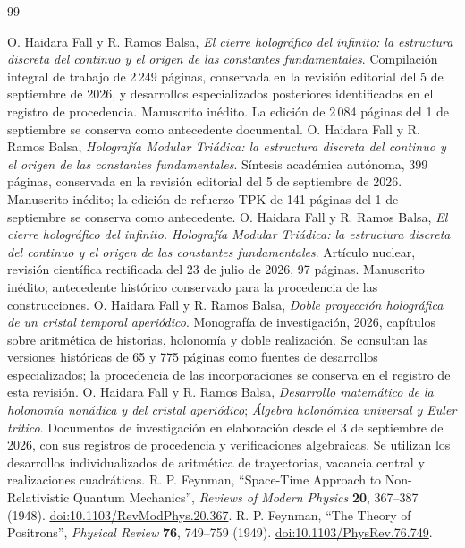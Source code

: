 \begin{thebibliography}{99}
{}
 O. Haidara Fall y R. Ramos Balsa, \emph{El cierre holográfico del infinito: la estructura discreta del continuo y el origen de las constantes fundamentales}. Compilación integral de trabajo de 2\,249 páginas, conservada en la revisión editorial del 5 de septiembre de 2026, y desarrollos especializados posteriores identificados en el registro de procedencia. Manuscrito inédito. La edición de 2\,084 páginas del 1 de septiembre se conserva como antecedente documental.
 O. Haidara Fall y R. Ramos Balsa, \emph{Holografía Modular Triádica: la estructura discreta del continuo y el origen de las constantes fundamentales}. Síntesis académica autónoma, 399 páginas, conservada en la revisión editorial del 5 de septiembre de 2026. Manuscrito inédito; la edición de refuerzo TPK de 141 páginas del 1 de septiembre se conserva como antecedente.
 O. Haidara Fall y R. Ramos Balsa, \emph{El cierre holográfico del infinito. Holografía Modular Triádica: la estructura discreta del continuo y el origen de las constantes fundamentales}. Artículo nuclear, revisión científica rectificada del 23 de julio de 2026, 97 páginas. Manuscrito inédito; antecedente histórico conservado para la procedencia de las construcciones.
 O. Haidara Fall y R. Ramos Balsa, \emph{Doble proyección holográfica de un cristal temporal aperiódico}. Monografía de investigación, 2026, capítulos sobre aritmética de historias, holonomía y doble realización. Se consultan las versiones históricas de 65 y 775 páginas como fuentes de desarrollos especializados; la procedencia de las incorporaciones se conserva en el registro de esta revisión.
 O. Haidara Fall y R. Ramos Balsa, \emph{Desarrollo matemático de la holonomía nonádica y del cristal aperiódico}; \emph{Álgebra holonómica universal y Euler trítico}. Documentos de investigación en elaboración desde el 3 de septiembre de 2026, con sus registros de procedencia y verificaciones algebraicas. Se utilizan los desarrollos individualizados de aritmética de trayectorias, vacancia central y realizaciones cuadráticas.
 R. P. Feynman, ``Space-Time Approach to Non-Relativistic Quantum Mechanics'', \emph{Reviews of Modern Physics} \textbf{20}, 367--387 (1948). \href{https://doi.org/10.1103/RevModPhys.20.367}{doi:10.1103/RevModPhys.20.367}.
 R. P. Feynman, ``The Theory of Positrons'', \emph{Physical Review} \textbf{76}, 749--759 (1949). \href{https://doi.org/10.1103/PhysRev.76.749}{doi:10.1103/PhysRev.76.749}.

\end{thebibliography}
